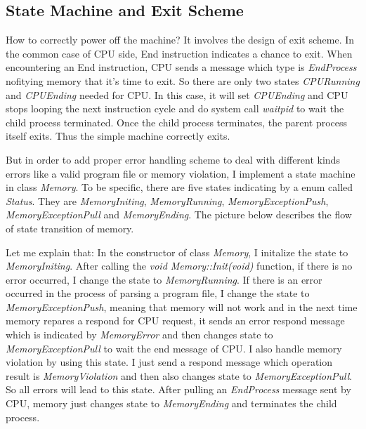 \documentclass[a4paper]{report}
\begin{document}
\subsection*{State Machine and Exit Scheme}
How to correctly power off the machine? It involves the design of exit scheme. In the common case of CPU side, End instruction indicates a chance to exit. When encountering an End instruction, CPU sends a message which type is \textit{\color{blue} EndProcess} nofitying memory that it's time to exit. So there are only two states \textit{\color{blue} CPURunning} and \textit{\color{blue} CPUEnding} needed for CPU. In this case, it will set \textit{\color{blue} CPUEnding} and CPU stops looping the next instruction cycle and do system call \textit{\color{blue} waitpid} to wait the child process terminated. Once the child process terminates, the parent process itself exits. Thus the simple machine correctly exits.

But in order to add proper error handling scheme to deal with different kinds errors like a valid program file or memory violation, I implement a state machine in class \textit{\color{blue} Memory}. To be specific, there are five states indicating by a enum called \textit{\color{blue} Status}. They are \textit{\color{blue} MemoryIniting}, \textit{\color{blue} MemoryRunning}, \textit{\color{blue} MemoryExceptionPush}, \textit{\color{blue} MemoryExceptionPull} and \textit{\color{blue} MemoryEnding}. The picture below describes the flow of state transition of memory.

Let me explain that: In the constructor of class \textit{\color{blue} Memory}, I initalize the state to \textit{\color{blue} MemoryIniting}. After calling the \textit{\color{blue} void Memory::Init(void)} function, if there is no error occurred, I change the state to \textit{\color{blue} MemoryRunning}. If there is an error occurred in the process of parsing a program file, I change the state to \textit{\color{blue} MemoryExceptionPush}, meaning that memory will not work and in the next time memory repares a respond for CPU request, it sends an error respond message which is indicated by \textit{\color{blue} MemoryError} and then changes state to \textit{\color{blue} MemoryExceptionPull} to wait the end message of CPU. I also handle memory violation by using this state. I just send a respond message which operation result is \textit{\color{blue} MemoryViolation} and then also changes state to \textit{\color{blue} MemoryExceptionPull}. So all errors will lead to this state. After pulling an \textit{\color{blue} EndProcess} message sent by CPU, memory just changes state to \textit{\color{blue} MemoryEnding} and terminates the child process.
\end{document}
